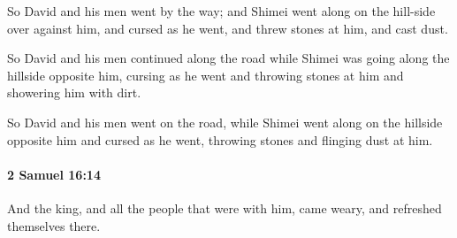 			\begin{versebox}
					\item[BHS] 
					\item[ASV] So David and his men went by the way; and Shimei went along on the hill-side over against him, and cursed as he went, and threw stones at him, and cast dust.
					\item[NIV] So David and his men continued along the road while Shimei was going along the hillside opposite him, cursing as he went and throwing stones at him and showering him with dirt.
					\item[NRSV] So David and his men went on the road, while Shimei went along on the hillside opposite him and cursed as he went, throwing stones and flinging dust at him.
			\end{versebox}

		\paragraph{2 Samuel 16:14} %
			\label{2SAMUEL-16-14}

			And the king, and all the people that were with him, came weary, and refreshed themselves there.

